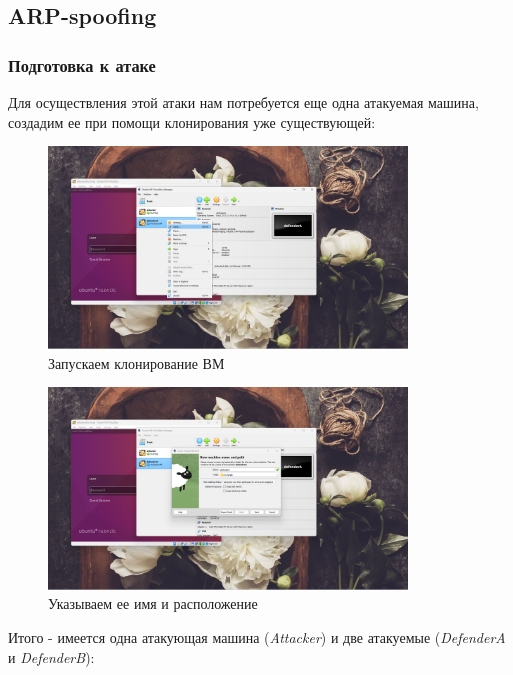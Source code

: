 \documentclass[a4paper]{article}
\begin{document}
  \subsection{ARP-spoofing}
  \subsubsection{Подготовка к атаке}

  Для осуществления этой атаки нам потребуется еще одна атакуемая машина, создадим ее
  при помощи клонирования уже существующей:

  \begin{figure}[H]
    \centering
    \includegraphics[width=0.85\textwidth]{02_00 (39)}
    \caption{Запускаем клонирование ВМ}
    \label{img:0029}
  \end{figure}

  \begin{figure}[H]
    \centering
    \includegraphics[width=0.85\textwidth]{02_00 (40)}
    \caption{Указываем ее имя и расположение}
    \label{img:0030}
  \end{figure}

  Итого - имеется одна атакующая машина (\textit{Attacker}) и две атакуемые (\textit{DefenderA} и \textit{DefenderB}):
\end{document}
